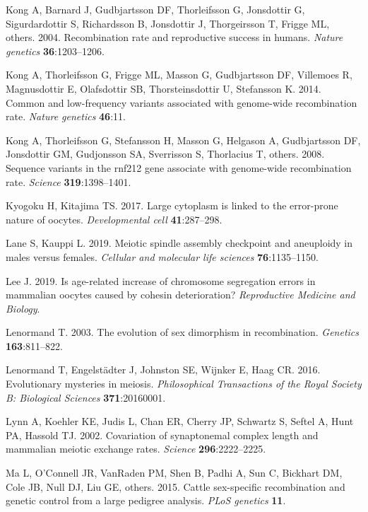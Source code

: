 \documentclass[
]{article}
\begin{document}
\leavevmode\hypertarget{ref-Kong2004}{}%
Kong A, Barnard J, Gudbjartsson DF, Thorleifsson G, Jonsdottir G,
Sigurdardottir S, Richardsson B, Jonsdottir J, Thorgeirsson T, Frigge
ML, others. 2004. Recombination rate and reproductive success in humans.
\emph{Nature genetics} \textbf{36}:1203--1206.

\leavevmode\hypertarget{ref-Kong2014}{}%
Kong A, Thorleifsson G, Frigge ML, Masson G, Gudbjartsson DF, Villemoes
R, Magnusdottir E, Olafsdottir SB, Thorsteinsdottir U, Stefansson K.
2014. Common and low-frequency variants associated with genome-wide
recombination rate. \emph{Nature genetics} \textbf{46}:11.

\leavevmode\hypertarget{ref-Kong2008}{}%
Kong A, Thorleifsson G, Stefansson H, Masson G, Helgason A, Gudbjartsson
DF, Jonsdottir GM, Gudjonsson SA, Sverrisson S, Thorlacius T, others.
2008. Sequence variants in the rnf212 gene associate with genome-wide
recombination rate. \emph{Science} \textbf{319}:1398--1401.

\leavevmode\hypertarget{ref-kyogoku2017}{}%
Kyogoku H, Kitajima TS. 2017. Large cytoplasm is linked to the
error-prone nature of oocytes. \emph{Developmental cell}
\textbf{41}:287--298.

\leavevmode\hypertarget{ref-LaneKauppi2019}{}%
Lane S, Kauppi L. 2019. Meiotic spindle assembly checkpoint and
aneuploidy in males versus females. \emph{Cellular and molecular life
sciences} \textbf{76}:1135--1150.

\leavevmode\hypertarget{ref-Lee2019}{}%
Lee J. 2019. Is age-related increase of chromosome segregation errors in
mammalian oocytes caused by cohesin deterioration? \emph{Reproductive
Medicine and Biology}.

\leavevmode\hypertarget{ref-lenormand2003}{}%
Lenormand T. 2003. The evolution of sex dimorphism in recombination.
\emph{Genetics} \textbf{163}:811--822.

\leavevmode\hypertarget{ref-lenormand2016}{}%
Lenormand T, Engelstädter J, Johnston SE, Wijnker E, Haag CR. 2016.
Evolutionary mysteries in meiosis. \emph{Philosophical Transactions of
the Royal Society B: Biological Sciences} \textbf{371}:20160001.

\leavevmode\hypertarget{ref-lynn2002}{}%
Lynn A, Koehler KE, Judis L, Chan ER, Cherry JP, Schwartz S, Seftel A,
Hunt PA, Hassold TJ. 2002. Covariation of synaptonemal complex length
and mammalian meiotic exchange rates. \emph{Science}
\textbf{296}:2222--2225.

\leavevmode\hypertarget{ref-ma2015_cattle}{}%
Ma L, O'Connell JR, VanRaden PM, Shen B, Padhi A, Sun C, Bickhart DM,
Cole JB, Null DJ, Liu GE, others. 2015. Cattle sex-specific
recombination and genetic control from a large pedigree analysis.
\emph{PLoS genetics} \textbf{11}.
\end{document}
